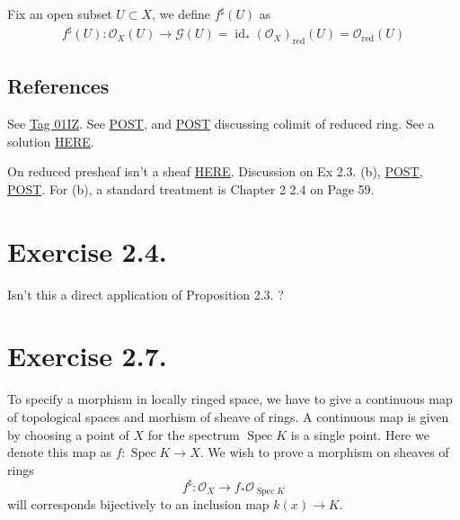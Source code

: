 Fix an open subset $U\subset X$, we define $f^{\sharp}(U)$ as 
\begin{align*}
    f^{\sharp}(U):\mathcal O_X(U)\to\mathcal G(U)=\operatorname{id}_{\ast}(\mathcal O_X)_{\text{red}}(U)=\mathcal O_{\text{red}}(U)
\end{align*}

\subsection{References}
See \href{https://stacks.math.columbia.edu/tag/01IZ}{Tag 01IZ}. See \href{https://math.stackexchange.com/questions/437227/colimit-of-reduced-rings}{POST}, and \href{https://math.stackexchange.com/questions/2737301/reducedness-and-colimit}{POST} discussing colimit of reduced ring. See a solution \href{https://www.math.ncku.edu.tw/~fjmliou/alg/reduced_scheme.pdf}{HERE}.

On reduced presheaf isn't a sheaf \href{https://math.stackexchange.com/questions/338185/the-reduced-presheaf}{HERE}. Discussion on Ex 2.3. (b), \href{https://math.stackexchange.com/questions/682230/exercise-2-3-from-hartshornes-algebraic-geometry}{POST}, \href{https://math.stackexchange.com/questions/441031/reduced-schemes-and-global-sections}{POST}. For (b), a standard treatment is \cite{qing2006algebraic} Chapter 2 2.4 on Page 59.

\section{Exercise 2.4.}

Isn't this a direct application of Proposition 2.3. \cite{hartshorne2013algebraic}? 

\section{Exercise 2.7.}

To specify a morphism in locally ringed space, we have to give a continuous map of topological spaces and morhism of sheave of rings. A continuous map is given by choosing a point of $X$ for the spectrum $\operatorname{Spec}K$ is a single point. Here we denote this map as $f:\operatorname{Spec}K\to X$. We wish to prove a morphism on sheaves of rings 
\[f^{\sharp}:\mathscr O_{X}\to f_{\ast}\mathscr O_{\operatorname{Spec}K}\] will corresponds bijectively to an inclusion map $k(x)\to K$.  

